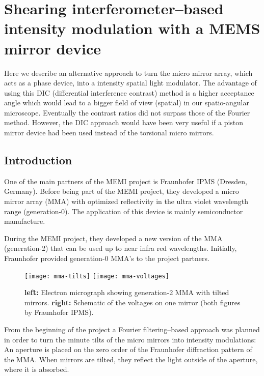 \chapter{Shearing interferometer--based intensity modulation with a
  MEMS mirror device}
\lstset{language=Maxima}
\begin{summary}
  Here we describe an alternative approach to turn the micro mirror
  array, which acts as a phase device, into a intensity spatial light
  modulator. The advantage of using this DIC (differential
  interference contrast) method is a higher acceptance angle which
  would lead to a bigger field of view (spatial) in our spatio-angular
  microscope. Eventually the contrast ratios did not surpass those of
  the Fourier method. However, the DIC approach would have been very
  useful if a piston mirror device had been used instead of the
  torsional micro mirrors.
\end{summary}
\section{Introduction}
One of the main partners of the MEMI project is Fraunhofer IPMS
(Dresden, Germany). Before being part of the MEMI project, they
developed a micro mirror array (MMA) with optimized reflectivity in
the ultra violet wavelength range (generation-0). The application of
this device is mainly semiconductor manufacture.

During the MEMI project, they developed a new version of the MMA
(generation-2) that can be used up to near infra red
wavelengths. Initially, Fraunhofer provided generation-0 MMA's to the
project partners.
\begin{figure}[htbp]
  \centering
  \texttt{[image: mma-tilts]}
  \texttt{[image: mma-voltages]}
  \caption{{\bf left:} Electron micrograph showing generation-2 MMA
    with tilted mirrors. {\bf right:} Schematic of the voltages on one
    mirror (both figures by Fraunhofer IPMS).}
  \label{fig:mma-tilts}
\end{figure}
From the beginning of the project a Fourier filtering--based approach
was planned in order to turn the minute tilts of the micro mirrors
into intensity modulations: An aperture is placed on the zero order of
the Fraunhofer diffraction pattern of the MMA. When mirrors are
tilted, they reflect the light outside of the aperture, where it is
absorbed.

